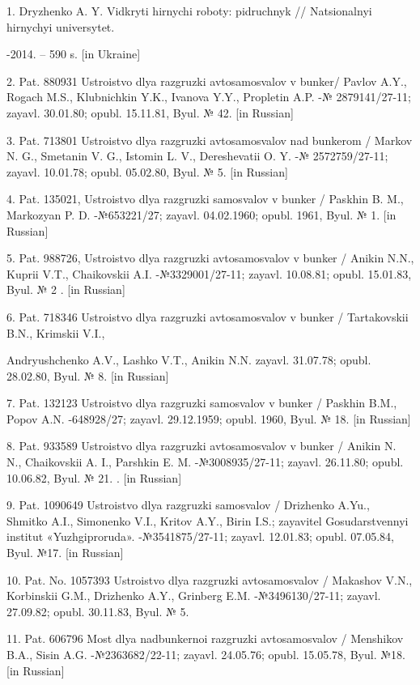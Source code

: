 \begin{noparindent}
1. Dryzhenko A. Y. Vidkryti hirnychi roboty: pidruchnyk // Natsionalnyi
hirnychyi universytet.

-2014. -- 590 s. {[}in Ukraine{]}

2. Pat. 880931 Ustroistvo dlya razgruzki avtosamosvalov v bunker/ Pavlov
A.Y., Rogach M.S., Klubnichkin Y.K., Ivanova Y.Y., Propletin A.P. -№
2879141/27-11; zayavl. 30.01.80; opubl. 15.11.81, Byul. № 42. {[}in
Russian{]}

3. Pat. 713801 Ustroistvo dlya razgruzki avtosamosvalov nad bunkerom /
Markov N. G., Smetanin V. G., Istomin L. V., Dereshevatii O. Y. -№
2572759/27-11; zayavl. 10.01.78; opubl. 05.02.80, Byul. № 5. {[}in
Russian{]}

4. Pat. 135021, Ustroistvo dlya razgruzki samosvalov v bunker / Paskhin
B. M., Markozyan P. D. -№653221/27; zayavl. 04.02.1960; opubl. 1961,
Byul. № 1. {[}in Russian{]}

5. Pat. 988726, Ustroistvo dlya razgruzki avtosamosvalov v bunker /
Anikin N.N., Kuprii V.T., Chaikovskii A.I. -№3329001/27-11; zayavl.
10.08.81; opubl. 15.01.83, Byul. № 2 . {[}in Russian{]}

6. Pat. 718346 Ustroistvo dlya razgruzki avtosamosvalov v bunker /
Tartakovskii B.N., Krimskii V.I.,

Andryushchenko A.V., Lashko V.T.,
Anikin N.N. zayavl. 31.07.78; opubl. 28.02.80, Byul. № 8. {[}in
Russian{]}

7. Pat. 132123 Ustroistvo dlya razgruzki samosvalov v bunker / Paskhin
B.M., Popov A.N. -648928/27; zayavl. 29.12.1959; opubl. 1960, Byul. №
18. {[}in Russian{]}

8. Pat. 933589 Ustroistvo dlya razgruzki avtosamosvalov v bunker /
Anikin N. N., Chaikovskii A. I., Parshkin E. M. -№3008935/27-11; zayavl.
26.11.80; opubl. 10.06.82, Byul. № 21. . {[}in Russian{]}

9. Pat. 1090649 Ustroistvo dlya razgruzki samosvalov / Drizhenko A.Yu.,
Shmitko A.I., Simonenko V.I., Kritov A.Y., Birin I.S.;
zayavitel\textquotesingle{} Gosudarstvennyi institut «Yuzhgiproruda».
-№3541875/27-11; zayavl. 12.01.83; opubl. 07.05.84, Byul. №17. {[}in
Russian{]}

10. Pat. No. 1057393 Ustroistvo dlya razgruzki avtosamosvalov / Makashov
V.N., Korbinskii G.M., Drizhenko A.Y., Grinberg E.M. -№3496130/27-11;
zayavl. 27.09.82; opubl. 30.11.83, Byul. № 5.

11. Pat. 606796 Most dlya nadbunkernoi razgruzki avtosamosvalov /
Menshikov B.A., Sisin A.G. -№2363682/22-11; zayavl. 24.05.76; opubl.
15.05.78, Byul. №18. {[}in Russian{]}


\end{noparindent}
